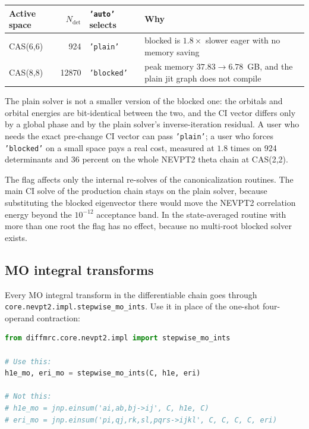 \begin{center}
\begin{tabular}{l r l p{}}
\toprule
Active space & $N_{\mathrm{det}}$ & \texttt{'auto'} selects & Why \\
\midrule
CAS(6,6) & 924 & \texttt{'plain'} & blocked is $1.8\times$ slower
  eager with no memory saving \\
CAS(8,8) & 12870 & \texttt{'blocked'} & peak memory
  $37.83 \to 6.78$~GB, and the plain jit graph does not compile \\
\bottomrule
\end{tabular}
\end{center}

The plain solver is not a smaller version of the blocked one: the
orbitals and orbital energies are bit-identical between the two, and
the CI vector differs only by a global phase and by the plain solver's
inverse-iteration residual.  A user who needs the exact pre-change CI
vector can pass \texttt{'plain'}; a user who forces \texttt{'blocked'}
on a small space pays a real cost, measured at $1.8$ times on 924
determinants and $36$ percent on the whole NEVPT2 theta chain at
CAS(2,2).

The flag affects only the internal re-solves of the canonicalization
routines.  The main CI solve of the production chain stays on the
plain solver, because substituting the blocked eigenvector there would
move the NEVPT2 correlation energy beyond the $10^{-12}$ acceptance
band.  In the state-averaged routine with more than one root the flag
has no effect, because no multi-root blocked solver exists.

\subsection{MO integral transforms}

Every MO integral transform in the differentiable chain goes through
\texttt{core.nevpt2.impl.\allowbreak stepwise\_mo\_ints}.  Use it in
place of the one-shot four-operand contraction:

\begin{lstlisting}[language=Python]
from diffmrc.core.nevpt2.impl import stepwise_mo_ints

# Use this:
h1e_mo, eri_mo = stepwise_mo_ints(C, h1e, eri)

# Not this:
# h1e_mo = jnp.einsum('ai,ab,bj->ij', C, h1e, C)
# eri_mo = jnp.einsum('pi,qj,rk,sl,pqrs->ijkl', C, C, C, C, eri)
\end{lstlisting}

